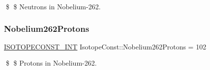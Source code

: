 \$ \$ Neutrons in Nobelium-\/262. \mbox{\label{group___isotope_const-_nobelium-_no262_ga963ecc5606fb33637557579c5fcd7530}} 
\subsubsection{\texorpdfstring{Nobelium262\+Protons}{Nobelium262Protons}}
{\footnotesize\ttfamily \mbox{\hyperlink{group___isotope_const-_macros_ga5f18360b3e99483a35c32d789e62621c}{I\+S\+O\+T\+O\+P\+E\+C\+O\+N\+S\+T\+\_\+\+I\+NT}} Isotope\+Const\+::\+Nobelium262\+Protons = 102}

\$ \$ Protons in Nobelium-\/262. 